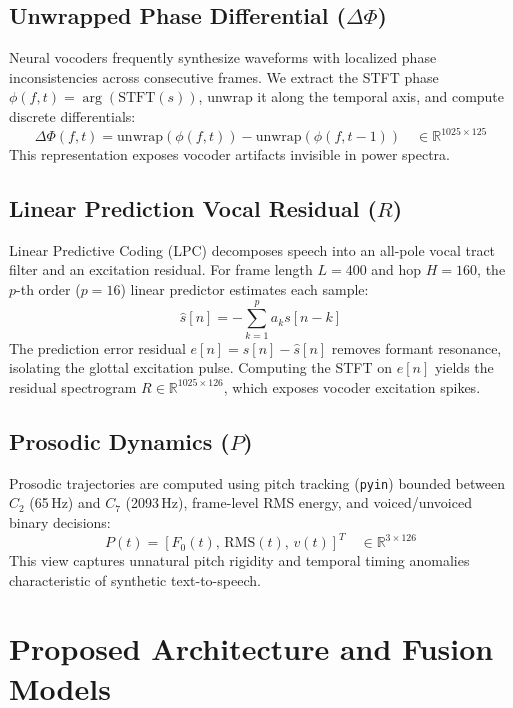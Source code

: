 \documentclass[conference]{IEEEtran}
\begin{document}
\subsection{Unwrapped Phase Differential ($\Delta \Phi$)}
Neural vocoders frequently synthesize waveforms with localized phase inconsistencies across consecutive frames. We extract the STFT phase $\phi(f, t) = \arg(\text{STFT}(s))$, unwrap it along the temporal axis, and compute discrete differentials:
\begin{equation}
    \Delta \Phi(f, t) = \text{unwrap}(\phi(f, t)) - \text{unwrap}(\phi(f, t-1)) \quad \in \mathbb{R}^{1025 \times 125}
\end{equation}
This representation exposes vocoder artifacts invisible in power spectra.

\subsection{Linear Prediction Vocal Residual ($R$)}
Linear Predictive Coding (LPC) decomposes speech into an all-pole vocal tract filter and an excitation residual. For frame length $L = 400$ and hop $H = 160$, the $p$-th order ($p=16$) linear predictor estimates each sample:
\begin{equation}
    \hat{s}[n] = -\sum_{k=1}^{p} a_k s[n-k]
\end{equation}
The prediction error residual $e[n] = s[n] - \hat{s}[n]$ removes formant resonance, isolating the glottal excitation pulse. Computing the STFT on $e[n]$ yields the residual spectrogram $R \in \mathbb{R}^{1025 \times 126}$, which exposes vocoder excitation spikes.

\subsection{Prosodic Dynamics ($P$)}
Prosodic trajectories are computed using pitch tracking (\texttt{pyin}) bounded between $C_2$ (65\,Hz) and $C_7$ (2093\,Hz), frame-level RMS energy, and voiced/unvoiced binary decisions:
\begin{equation}
    P(t) = \left[ F_0(t), \, \text{RMS}(t), \, v(t) \right]^T \quad \in \mathbb{R}^{3 \times 126}
\end{equation}
This view captures unnatural pitch rigidity and temporal timing anomalies characteristic of synthetic text-to-speech.

\section{Proposed Architecture and Fusion Models}
\end{document}
